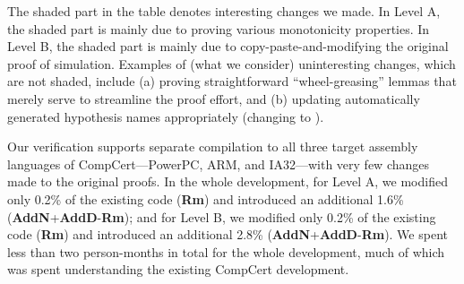 The shaded part in the table denotes interesting changes we made.  In
Level A, the shaded part is mainly due to proving various monotonicity
properties. In Level B, the shaded part is mainly due to
copy-paste-and-modifying the original proof of simulation.  Examples of
(what we consider) uninteresting changes, which are not shaded,
include (a) proving straightforward ``wheel-greasing'' lemmas that
merely serve to streamline the proof effort, and (b) updating
automatically generated hypothesis names appropriately (\eg changing
 to ).

Our verification supports separate compilation to all three target
assembly languages of CompCert---PowerPC, ARM, and IA32---with very
few changes made to the original proofs. In the whole development, for
Level A, we modified only 0.2\% of the existing code (\textbf{Rm}) and
introduced an additional 1.6\%
(\textbf{AddN}+\textbf{AddD}-\textbf{Rm}); and for Level B, we
modified only 0.2\% of the existing code (\textbf{Rm}) and introduced
an additional 2.8\% (\textbf{AddN}+\textbf{AddD}-\textbf{Rm}).  We
spent less than two person-months in total for the whole development,
much of which was spent understanding the existing CompCert
development.



